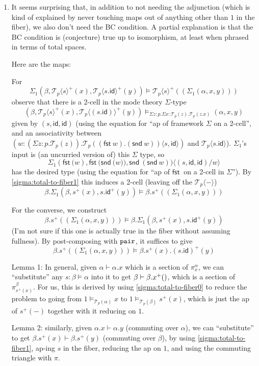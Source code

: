 \documentclass[10pt]{article}
\theoremstyle{definition}
\newcommand\dsd[1]{\ensuremath{\mathsf{#1}}}
\newcommand{\app}[2]{\ensuremath{#1 \: #2}}
\newcommand{\fst}[1]{\app{\dsd{fst}}{#1}}
\newcommand{\snd}[1]{\app{\dsd{snd}}{#1}}
\newcommand{\id}{\mathsf{id}}
\newcommand\TrPlus[2]{\ensuremath{{#1}^+(#2)}}
\newcommand\El[2]{\mathcal{T}_{#1}(#2)}
\newcommand\ApEl[2]{\mathcal{T}_{#1}\langle#2\rangle}
\newcommand\ap[2]{\ensuremath{#1 \langle #2 \rangle }}
\begin{document}
\begin{enumerate}
\item It seems surprising that, in addition to not needing the
  adjunction (which is kind of explained by never touching maps out of
  anything other than $1$ in the fiber), we also don't need the BC
  condition.  A partial explanation is that the BC condition is
  (conjecture) true up to isomorphism, at least when phrased in terms of
  total spaces.

  Here are the maps:

  For 
  \[
  \Sigma_1(\beta,\TrPlus{\ApEl{p}{s}}{x}, \TrPlus{\ApEl{p}{s.\id}}{y}) \vDash \TrPlus{\ApEl{p}{s}}{(\Sigma_1(\alpha,x,y))} 
  \]
  observe that there is a 2-cell in the mode theory $\Sigma$-type
  \[
  (\beta,\TrPlus{\ApEl{p}{s}}{x}, \TrPlus{\ApEl{p}{(s . \id)}}{y}) \vDash_{\Sigma z:p.\Sigma x:\El{p}{z}.\El{p}{z.x}} (\alpha,x,y)
  \]
  given by $(s, \id, \id)$ (using the equation for ``ap of framework
  $\Sigma$ on a 2-cell'', and an associativity between $(\ap{w:(\Sigma
    z:p.\El{p}{z}).\El{p}{(\fst w).(\snd w)}}{s , \id})$ and
  $\ApEl{p}{s.\id}$).  $\Sigma_1$'s input is (an uncurried version of)
  this $\Sigma$ type, so
  \[
  \ap{\Sigma_1 (\fst(w), \fst({\snd (w)}), \snd{(\snd w)})}{(s, \id, \id)/w}
  \]
  has the desired type (using the equation for ``ap of \fst{} on a
  2-cell in $\Sigma$'').
  By \ref{sigma:total-to-fiber1} this induces a 2-cell (leaving off the $\ApEl{p}{-}$)
  \[
  \beta.\Sigma_1(\beta,\TrPlus{s}{x}, \TrPlus{s.\id}{y}) \vDash \beta.\TrPlus{s}{(\Sigma_1(\alpha,x,y))} 
  \]

  For the converse, we construct 
  \[
  \beta.\TrPlus{s}{(\Sigma_1(\alpha,x,y))} \vDash \beta.\Sigma_1(\beta,\TrPlus{s}{x}, \TrPlus{s.\id}{y}) 
  \]
  (I'm not sure if this one is actually true in the fiber without
  assuming fullness).
  By post-composing with $\mathtt{pair}$, it suffices to give 
  \[
  \beta.\TrPlus{s}{(\Sigma_1(\alpha,x,y))} \vDash \beta.\TrPlus{s}{x}.\TrPlus{(s.\id)}{y}
  \]

  Lemma 1: In general, given $\alpha \vdash \alpha.x$ which is a section
  of $\pi^\alpha_x$, we can ``substitute'' any $s : \beta \vDash \alpha$
  into it to get $\beta \vdash \beta.\TrPlus{x}$, which is a section of
  $\pi^\beta_{\TrPlus{s}{x}}$.  For us, this is derived by using
  \ref{sigma:total-to-fiber0} to reduce the problem to going from $1
  \vDash_{\El{p}{\alpha}} x$ to $1 \vDash_{\El{p}{\beta}}
  \TrPlus{s}{x}$, which is just the ap of ${\TrPlus{s}{-}}$ together
  with it reducing on $1$.

  Lemma 2: similarly, given $\alpha.x \vdash \alpha.y$ (commuting over
  $\alpha$), we can ``substitute'' to get $\beta.\TrPlus{s}{x} \vdash
  \beta.\TrPlus{s}{y}$ (commuting over $\beta$), by using
  \ref{sigma:total-to-fiber1}, ap-ing $s$ in the fiber, reducing the ap
  on $1$, and using the commuting triangle with $\pi$.


\end{enumerate}
\end{document}
